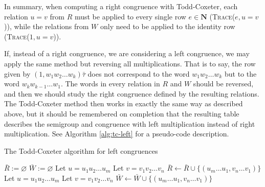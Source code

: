 In summary, when computing a right congruence with Todd-Coxeter, each relation
$u=v$ from $R$ must be applied to every single row $e \in \mathbf{N}$
(\textsc{Trace($e, u=v$)}), while the relations from $W$ only need to be applied
to the identity row (\textsc{Trace($1, u=v$)}).

If, instead of a right congruence, we are considering a left congruence, we may
apply the same method but reversing all multiplications.  That is to say, the
row given by $(1, w_1 w_2 \ldots w_k)\bar\tau$ does not correspond to the word
$w_1 w_2 \ldots w_k$ but to the word $w_k w_{k-1} \ldots w_1$.  The words in
every relation in $R$ and $W$ should be reversed, and then we should study the
right congruence defined by the resulting relations.  The Todd-Coxeter method
then works in exactly the same way as described above, but it should be
remembered on completion that the resulting table describes the semigroup and
congruence with left multiplication instead of right multiplication.  See
Algorithm \ref{alg:tc-left} for a pseudo-code description.

\begin{algorithm}
\caption{The Todd-Coxeter algorithm for left congruences}
\label{alg:tc-left}
\begin{algorithmic}[1]
\State $\bar R := \varnothing$
\State $\bar W := \varnothing$
  \State Let $u = u_1 u_2 \ldots u_m$ 
  \State Let $v = v_1 v_2 \ldots v_n$ 
  \State $\bar R \gets \bar R \cup \{(u_m \ldots u_1, v_n \ldots v_1)\}$
\EndFor
{}
  \State Let $u = u_1 u_2 \ldots u_m$ 
  \State Let $v = v_1 v_2 \ldots v_n$ 
  \State $\bar W \gets \bar W \cup \{(u_m \ldots u_1, v_n \ldots v_1)\}$
\EndFor
\State \Return {}
\EndProcedure
\end{algorithmic}
\end{algorithm}

